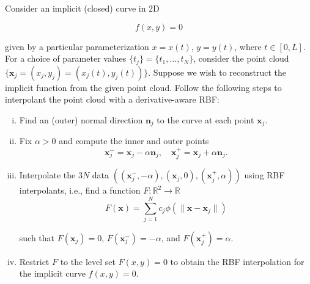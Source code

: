 Consider an implicit (closed) curve in 2D

$$
f(x, y) = 0
$$

given by a particular parameterization $x = x(t)$, $y = y(t)$, where $t \in [0, L]$. For a choice of parameter values
$\{t_j\} = \{t_1, \dots, t_N\}$, consider the point cloud \linebreak
$\{ \bm{x}_j = \left( x_j, y_j \right) = \left( x_j(t), y_j(t) \right) \}$. Suppose we wish to reconstruct the implicit 
function from the given point cloud. Follow the following steps to interpolant the point cloud with a derivative-aware 
RBF:


\begin{enumerate}[(i)]
  \item Find an (outer) normal direction $\bm{n}_j$ to the curve at each point $\bm{x}_j$.
  \item Fix $\alpha > 0$ and compute the inner and outer points
        $$
          \bm{x}_j^- = \bm{x}_j - \alpha \bm{n}_j, \quad \bm{x}_j^+ = \bm{x}_j + \alpha \bm{n}_j.
        $$
  \item Interpolate the $3N$ data $\left( (\bm{x}_j^-, -\alpha), (\bm{x}_j, 0), (\bm{x}_j^+, \alpha) \right)$ using RBF interpolants, i.e., find a function $F: \mathbb{R}^2 \to \mathbb{R}$
        $$
          F(\bm{x}) = \sum\limits_{j=1}^{N} c_j \phi \left( \lVert \bm{x} - \bm{x}_j \rVert \right)
        $$

        such that $F(\bm{x}_j) = 0$, $F(\bm{x}_j^-) = -\alpha$, and $F(\bm{x}_j^+) = \alpha$.
  \item Restrict $F$ to the level set $F(x, y) = 0$ to obtain the RBF interpolation for the implicit curve $f(x, y) = 0$.
\end{enumerate}

